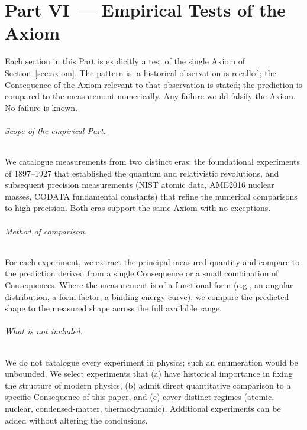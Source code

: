 \documentclass[11pt,twocolumn,a4paper]{article}
\theoremstyle{axiomstyle}
\theoremstyle{conseqstyle}
\theoremstyle{definition}
\theoremstyle{remark}
\begin{document}
\clearpage

\part*{Part VI --- Empirical Tests of the Axiom}

Each section in this Part is explicitly a test of the single Axiom of Section~\ref{sec:axiom}. The pattern is: a historical observation is recalled; the Consequence of the Axiom relevant to that observation is stated; the prediction is compared to the measurement numerically. Any failure would falsify the Axiom. No failure is known.

\paragraph{Scope of the empirical Part.} We catalogue measurements from two distinct eras: the foundational experiments of 1897--1927 that established the quantum and relativistic revolutions, and subsequent precision measurements (NIST atomic data, AME2016 nuclear masses, CODATA fundamental constants) that refine the numerical comparisons to high precision. Both eras support the same Axiom with no exceptions.

\paragraph{Method of comparison.} For each experiment, we extract the principal measured quantity and compare to the prediction derived from a single Consequence or a small combination of Consequences. Where the measurement is of a functional form (e.g., an angular distribution, a form factor, a binding energy curve), we compare the predicted shape to the measured shape across the full available range.

\paragraph{What is not included.} We do not catalogue every experiment in physics; such an enumeration would be unbounded. We select experiments that (a) have historical importance in fixing the structure of modern physics, (b) admit direct quantitative comparison to a specific Consequence of this paper, and (c) cover distinct regimes (atomic, nuclear, condensed-matter, thermodynamic). Additional experiments can be added without altering the conclusions.
\end{document}
